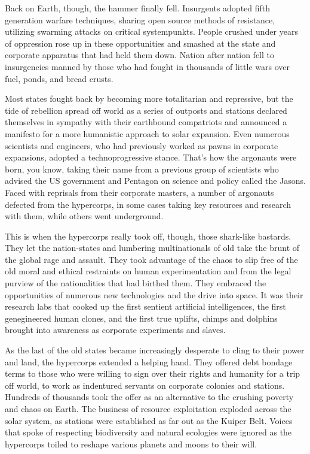 Back on Earth, though, the hammer finally fell. Insurgents adopted
fifth generation warfare techniques, sharing open source methods of
resistance, utilizing swarming attacks on critical
systempunkts. People crushed under years of oppression rose up in
these opportunities and smashed at the state and corporate apparatus
that had held them down. Nation after nation fell to insurgencies
manned by those who had fought in thousands of little wars over fuel,
ponds, and bread crusts.

Most states fought back by becoming more totalitarian and repressive,
but the tide of rebellion spread off world as a series of outposts and
stations declared themselves in sympathy with their earthbound
compatriots and announced a manifesto for a more humanistic approach
to solar expansion. Even numerous scientists and engineers, who had
previously worked as pawns in corporate expansions, adopted a
technoprogressive stance. That's how the argonauts were born, you
know, taking their name from a previous group of scientists who
advised the US government and Pentagon on science and policy called
the Jasons.  Faced with reprisals from their corporate masters, a
number of argonauts defected from the hypercorps, in some cases taking
key resources and research with them, while others went underground.

This is when the hypercorps really took off, though, those shark-like
bastards. They let the nation-states and lumbering multinationals of
old take the brunt of the global rage and assault. They took advantage
of the chaos to slip free of the old moral and ethical restraints on
human experimentation and from the legal purview of the nationalities
that had birthed them. They embraced the opportunities of numerous new
technologies and the drive into space. It was their research labs that
cooked up the first sentient artificial intelligences, the first
genegineered human clones, and the first true uplifts, chimps and
dolphins brought into awareness as corporate experiments and slaves.

As the last of the old states became increasingly desperate to cling
to their power and land, the hypercorps extended a helping hand. They
offered debt bondage terms to those who were willing to sign over
their rights and humanity for a trip off world, to work as indentured
servants on corporate colonies and stations. Hundreds of thousands
took the offer as an alternative to the crushing poverty and chaos on
Earth.  The business of resource exploitation exploded across the
solar system, as stations were established as far out as the Kuiper
Belt. Voices that spoke of respecting biodiversity and natural
ecologies were ignored as the hypercorps toiled to reshape various
planets and moons to their will.


